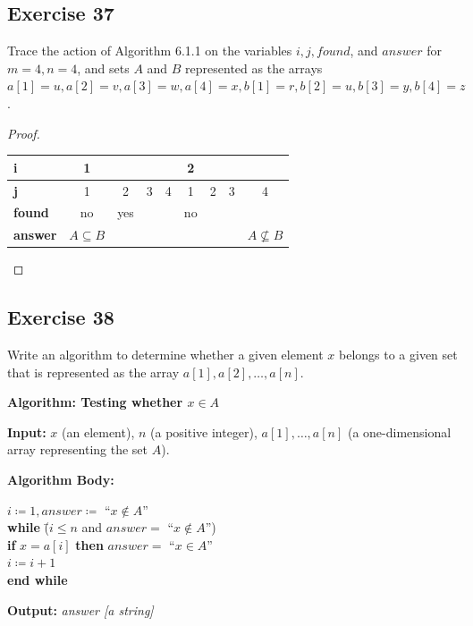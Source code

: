 \documentclass[14pt]{extarticle}
\newcommand{\cy}{\color{cyan}}
\begin{document}
\subsection{Exercise 37}
Trace the action of Algorithm 6.1.1 on the variables $i, j, found$, and $answer$ for $m = 4, n = 4$, and sets $A$ and 
$B$ represented as the arrays \(a[1] = u, a[2] = v, a[3] = w, a[4] = x, b[1] = r, b[2] = u, b[3] = y, b[4] = z\).

\begin{proof}
\begin{center}
\begin{tabular}{|l|c|c|c|c|c|c|c|c|}
\hline
{\bf i} & 1 & & & & 2 & & & \\
\hline
{\bf j} & 1 & 2 & 3 & 4 & 1 & 2 & 3 & 4 \\
\hline
{\bf found} & no & yes & & & no & & & \\
\hline
{\bf answer} & \(A \subseteq B\) & & & & & & & \(A \nsubseteq B\) \\
\hline
\end{tabular}
\end{center}
\end{proof}

\subsection{Exercise 38}
Write an algorithm to determine whether a given element $x$ belongs to a given set that is represented as the array 
\(a[1], a[2], \ldots, a[n]\).

\begin{tcolorbox}[colframe=cyan]
{\bf \cy Algorithm: Testing whether $x \in A$} 

{\bf \cy Input:} $x$ (an element), $n$ (a positive integer), \(a[1], \ldots, a[n]\) (a one-dimensional array 
representing the set $A$).

{\bf \cy Algorithm Body:}
\begin{tabbing}
\(i \coloneqq 1, answer \coloneqq\) ``\(x \notin A\)'' \\
{\bf while} \= (\(i \leq n\) and \(answer =\) ``\(x \notin A\)'') \\
            \> {\bf if} \(x = a[i]\) {\bf then} \(answer = \) ``\(x \in A\)'' \\
            \> \(i \coloneqq i + 1\) \\
{\bf end while}
\end{tabbing}
{\bf \cy Output:} {\it answer [a string]}
\end{tcolorbox}
\end{document}
